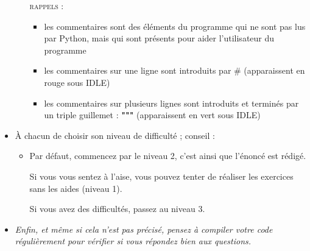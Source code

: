 \documentclass[11pt]{article}
\begin{document}
\begin{itemize}
\begin{itemize}
 \medskip
 \textsc{rappels : }
 \begin{itemize}
  \item les commentaires sont des éléments du programme qui ne sont pas lus par Python, mais qui sont présents pour aider l'utilisateur du programme
  
  \medskip
  \item les commentaires sur une ligne sont introduits par \# (apparaissent en rouge sous IDLE)
  
  \medskip
  \item les commentaires sur plusieurs lignes sont introduits et terminés par un triple guillemet : \textbf{"""} (apparaissent en vert sous IDLE)
 \end{itemize}
 
\end{itemize}








\bigskip






\item À chacun de choisir son niveau de difficulté ; conseil : 

\begin{itemize}
 \item Par défaut, commencez par le niveau 2, c'est ainsi que l'énoncé est rédigé. 
 
 Si vous vous sentez à l'aise, vous pouvez tenter de réaliser les exercices sans les aides (niveau 1).
 
 Si vous avez des difficultés, passez au niveau 3.
\end{itemize}








\bigskip









\item \textit{Enfin, et même si cela n'est pas précisé, pensez à compiler votre code régulièrement pour vérifier si vous répondez bien aux questions.}

\end{itemize}






\end{document}
